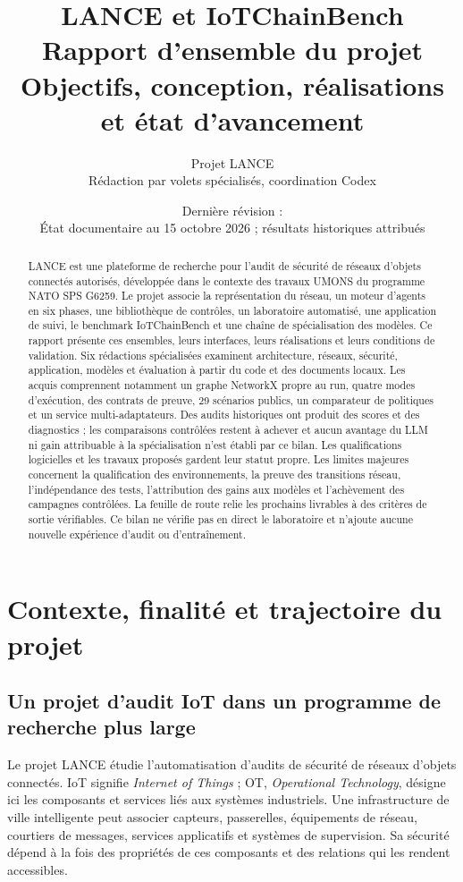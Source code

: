 \documentclass[11pt,a4paper]{article}
\title{LANCE et IoTChainBench\\[4pt]
\large Rapport d'ensemble du projet\\
Objectifs, conception, réalisations et état d'avancement}
\author{Projet LANCE\\\small Rédaction par volets spécialisés, coordination Codex}
\date{Dernière révision : \revision\\[3pt]
\small État documentaire au 15 octobre 2026 ; résultats historiques attribués}
\begin{document}
\maketitle
\begin{abstract}
LANCE est une plateforme de recherche pour l'audit de sécurité de réseaux
d'objets connectés autorisés, développée dans le contexte des travaux UMONS
du programme NATO SPS G6259. Le projet associe la représentation du réseau,
un moteur d'agents en six phases, une bibliothèque de contrôles, un laboratoire
automatisé, une application de suivi, le benchmark IoTChainBench et une chaîne
de spécialisation des modèles. Ce rapport présente ces ensembles, leurs
interfaces, leurs réalisations et leurs conditions de validation. Six rédactions
spécialisées examinent architecture, réseaux, sécurité, application, modèles et
évaluation à partir du code et des documents locaux. Les acquis comprennent
notamment un graphe NetworkX propre au run, quatre modes d'exécution,
des contrats de preuve, 29 scénarios publics, un comparateur de politiques
et un service multi-adaptateurs. Des audits historiques ont produit des scores
et des diagnostics ; les comparaisons contrôlées restent à achever et aucun
avantage du LLM ni gain attribuable à la spécialisation n'est établi par ce bilan.
Les qualifications logicielles et les travaux proposés gardent leur statut propre.
Les limites majeures concernent
la qualification des environnements, la preuve des transitions réseau,
l'indépendance des tests, l'attribution des gains aux modèles et l'achèvement
des campagnes contrôlées. La feuille de route relie les prochains livrables
à des critères de sortie vérifiables. Ce bilan ne vérifie pas en direct
le laboratoire et n'ajoute aucune nouvelle expérience d'audit ou d'entraînement.
\end{abstract}
\tableofcontents
\clearpage
\section{Contexte, finalité et trajectoire du projet}
\label{sec:contexte}
\subsection{Un projet d'audit IoT dans un programme de recherche plus large}
Le projet LANCE étudie l'automatisation d'audits de sécurité de réseaux d'objets
connectés. IoT signifie \emph{Internet of Things} ; OT, \emph{Operational
Technology}, désigne ici les composants et services liés aux systèmes
industriels. Une infrastructure de ville intelligente peut associer capteurs,
passerelles, équipements de réseau, courtiers de messages, services applicatifs
et systèmes de supervision. Sa sécurité dépend à la fois des propriétés de ces
composants et des relations qui les rendent accessibles.
\end{document}
